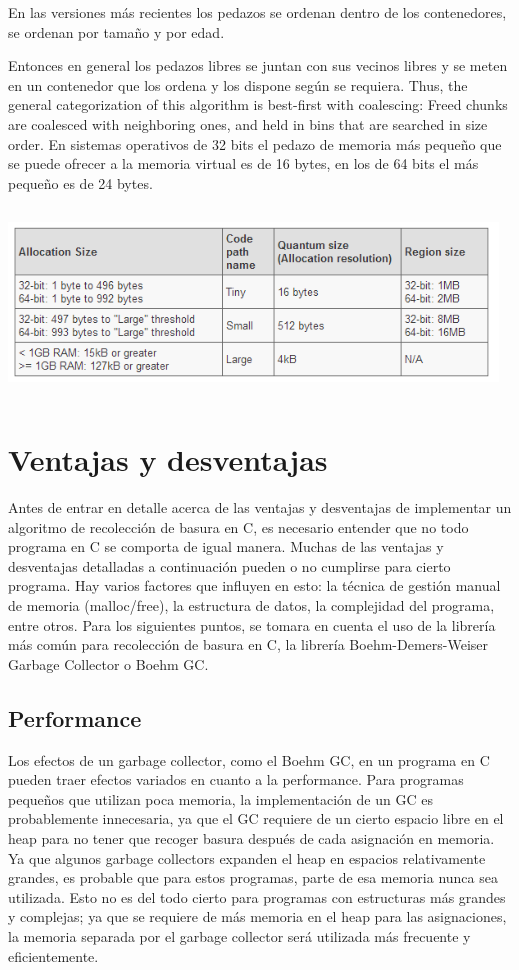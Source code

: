 \documentclass[11pt]{article} %
\begin{document}
En las versiones más recientes los pedazos se ordenan dentro de los contenedores, se ordenan por tamaño y por edad.

Entonces en general los pedazos libres se juntan con sus vecinos libres y se meten en un contenedor que los ordena y los dispone según se requiera.
Thus, the general categorization of this algorithm is best-first with coalescing: Freed chunks are coalesced with neighboring ones, and held in bins that are searched in size order.
En sistemas operativos de 32 bits el pedazo de memoria más pequeño que se puede ofrecer a la memoria virtual es de 16 bytes, en los de 64 bits el más pequeño es de 24 bytes.

\includegraphics[width=13cm,height=5cm]{imagenes/malloc.png}




\section{Ventajas y desventajas}
	Antes de entrar en detalle acerca de las ventajas y desventajas de implementar un algoritmo de recolección de basura en C, es necesario entender que no todo programa en C se comporta de igual manera. Muchas de las ventajas y desventajas detalladas a continuación pueden o no cumplirse para cierto programa. Hay varios factores que influyen en esto: la técnica de gestión manual de memoria (malloc/free), la estructura de datos, la complejidad del programa, entre otros.
	Para los siguientes puntos, se tomara en cuenta el uso de la librería más común para recolección de basura en C, la librería Boehm-Demers-Weiser Garbage Collector o Boehm GC.
\subsection{Performance}
	Los efectos de un garbage collector, como el Boehm GC, en un programa en C pueden traer efectos variados en cuanto a la performance. Para programas pequeños que utilizan poca memoria, la implementación de un GC es probablemente innecesaria, ya que el GC requiere de un cierto espacio libre en el heap para no tener que recoger basura después de cada asignación en memoria. Ya que algunos garbage collectors expanden el heap en espacios relativamente grandes, es probable que para estos programas, parte de esa memoria nunca sea utilizada. Esto no es del todo cierto para programas con estructuras más grandes y complejas; ya que se requiere de más memoria en el heap para las asignaciones, la memoria separada por el garbage collector será utilizada más frecuente y eficientemente.
\end{document}
